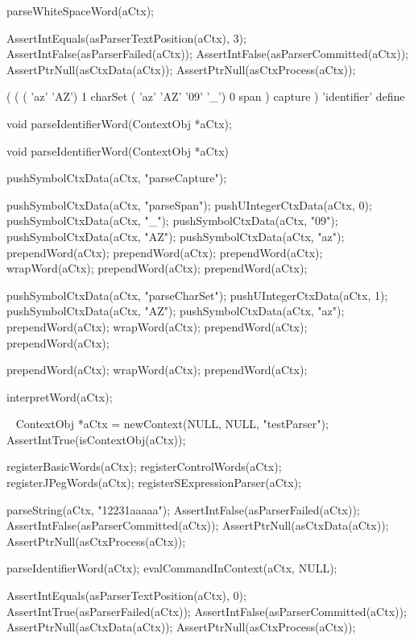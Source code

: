   parseWhiteSpaceWord(aCtx);
  
  AssertIntEquals(asParserTextPosition(aCtx), 3);
  AssertIntFalse(asParserFailed(aCtx));
  AssertIntFalse(asParserCommitted(aCtx));
  AssertPtrNull(asCtxData(aCtx));
  AssertPtrNull(asCtxProcess(aCtx));
\stopCTest
\stopTestCase
\stopTestSuite

\startTestSuite[parseIdentifierWord]

\starttyping
(
  (
    ( 'az' 'AZ') 1 charSet
    ( 'az' 'AZ' '09' '_') 0 span
  ) capture
) 'identifier' define
\stoptyping

\startCHeader
void parseIdentifierWord(ContextObj *aCtx);
\stopCHeader

\startCCode
void parseIdentifierWord(ContextObj *aCtx) {

  pushSymbolCtxData(aCtx, "parseCapture");

  pushSymbolCtxData(aCtx, "parseSpan");
  pushUIntegerCtxData(aCtx, 0);
  pushSymbolCtxData(aCtx, "_");
  pushSymbolCtxData(aCtx, "09");
  pushSymbolCtxData(aCtx, "AZ");
  pushSymbolCtxData(aCtx, "az");
  prependWord(aCtx);
  prependWord(aCtx);
  prependWord(aCtx);
  wrapWord(aCtx);
  prependWord(aCtx);
  prependWord(aCtx);

  pushSymbolCtxData(aCtx, "parseCharSet");
  pushUIntegerCtxData(aCtx, 1);
  pushSymbolCtxData(aCtx, "AZ");
  pushSymbolCtxData(aCtx, "az");
  prependWord(aCtx);
  wrapWord(aCtx);
  prependWord(aCtx);
  prependWord(aCtx);
  
  prependWord(aCtx);
  wrapWord(aCtx);
  prependWord(aCtx);
  
  interpretWord(aCtx);
}
\stopCCode

\CTestsSuiteSetup\
\startCTest
  ContextObj *aCtx = newContext(NULL, NULL, "testParser");
  AssertIntTrue(isContextObj(aCtx));
  
  registerBasicWords(aCtx);
  registerControlWords(aCtx);
  registerJPegWords(aCtx);
  registerSExpressionParser(aCtx);
\stopCTest

\startCTest
  parseString(aCtx, "12231aaaaa");
  AssertIntFalse(asParserFailed(aCtx));
  AssertIntFalse(asParserCommitted(aCtx));
  AssertPtrNull(asCtxData(aCtx));
  AssertPtrNull(asCtxProcess(aCtx));
  
  parseIdentifierWord(aCtx);
  evalCommandInContext(aCtx, NULL);
  
  AssertIntEquals(asParserTextPosition(aCtx), 0);
  AssertIntTrue(asParserFailed(aCtx));
  AssertIntFalse(asParserCommitted(aCtx));
  AssertPtrNull(asCtxData(aCtx));
  AssertPtrNull(asCtxProcess(aCtx));
\stopCTest
\stopTestCase

